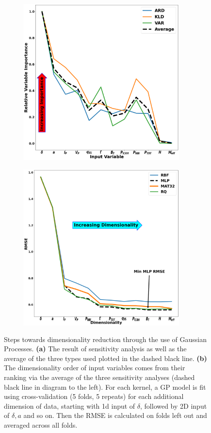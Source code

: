 \documentclass[a4paper, twoside, final, 12pt]{article}
\begin{document}
{\begin{figure}
	\begin{subfigure}{0.48\linewidth}
		\centering
		\includegraphics[width=8.5cm]{ ./src/GP_sensitivity_analysis_final_v1_scaled}
				\caption{}
		\label{subfig:GP_sens}
	\end{subfigure}\hfill
	\begin{subfigure}{0.48\linewidth}
		\centering
		\includegraphics[width=8.5cm]{ ./src/final_GP_dim_v1_scaled_words}
				\caption{}
		\label{subfig:GP_dimens}
	\end{subfigure}
	\caption{Steps towards dimensionality reduction through the use of Gaussian Processes. \textbf{(a)} The result of sensitivity analysis as well as the average of the three types used plotted in the dashed black line. \textbf{(b)} The dimensionality order of input variables comes from their ranking via the average of the three sensitivity analyses (dashed black line in diagram to the left). For each kernel, a GP model is fit using cross-validation (5 folds, 5 repeats) for each additional dimension of data, starting with 1d input of $\delta$, followed by 2D input of $\delta, a$ and so on. Then the RMSE is calculated on folds left out and averaged across all folds. } \label{fig:GP_dim}
\end{figure}

}
\end{document}
